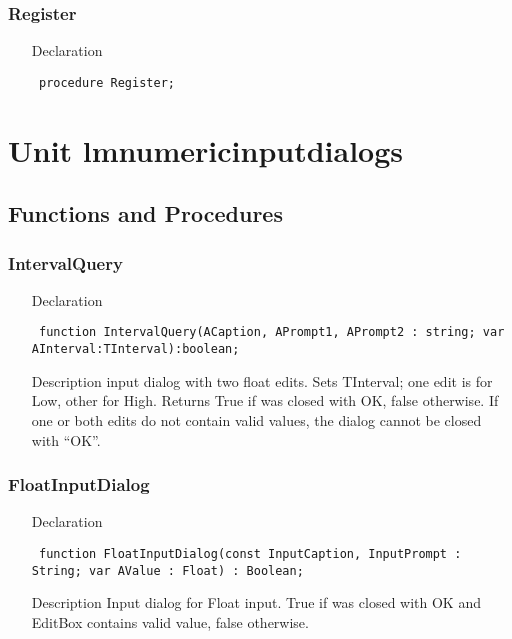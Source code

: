 \documentclass[12pt,a4paper,oneside]{report}
\newcommand{\declarationitem}[1]{{\addfontfeatures{FakeBold=1.3} #1}}
\newcommand{\descriptiontitle}[1]{{\addfontfeatures{FakeSlant}#1}}
\newcommand{\code}[1]{\texttt{#1}}
\begin{document}
\subsection{Register}
\label{lmnumericedits-Register}
\begin{itemize}\item[\declarationitem{Declaration}\hfill]
\begin{flushleft}
\code{
procedure Register;}

\end{flushleft}

\end{itemize}
\chapter{Unit lmnumericinputdialogs}
\label{lmnumericinputdialogs}
\section{Functions and Procedures}
\subsection{IntervalQuery}
\label{lmnumericinputdialogs-IntervalQuery}
\begin{itemize}\item[\declarationitem{Declaration}\hfill]
\begin{flushleft}
\code{
function IntervalQuery(ACaption, APrompt1, APrompt2 : string; var AInterval:TInterval):boolean;}

\end{flushleft}

\par
\item[\descriptiontitle{Description}]
input dialog with two float edits. Sets TInterval; one edit is for Low, other for High. Returns True if was closed with OK, false otherwise. If one or both edits do not contain valid values, the dialog cannot be closed with ``OK''.

\end{itemize}
\subsection{FloatInputDialog}
\label{lmnumericinputdialogs-FloatInputDialog}
\begin{itemize}\item[\declarationitem{Declaration}\hfill]
\begin{flushleft}
\code{
function FloatInputDialog(const InputCaption, InputPrompt : String; var AValue : Float) : Boolean;}
\end{flushleft}
\item[\descriptiontitle{Description}]
Input dialog for Float input. True if was closed with OK and EditBox contains valid value, false otherwise. 
\end{itemize}
\end{document}
